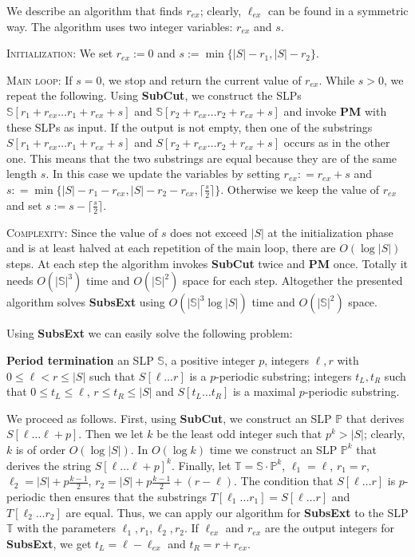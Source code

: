 \documentclass[11pt]{article}
\theoremstyle{break}
\newcommand{\slp}[1]{\mathbb{#1}}
\newcommand{\substr}[2]{[#1\dots#2]}
\newcommand{\subslp}[3]{\slp{#1}[#2\dots#3]}
\newcommand{\problem}[3]{\smallskip
            \noindent {\sc Problem:} \textbf{#1} \newline
            \noindent {\sc Input:} #2 \newline
            \noindent {\sc Output:} #3
\smallskip}
\begin{document}
We describe an algorithm that finds $r_{ex}$; clearly, $\ell_{ex}$ can be found in a symmetric way. The algorithm uses two integer
variables: $r_{ex}$ and $s$.

\smallskip

\noindent \textsc{Initialization:} We set $r_{ex}:=0$ and $s:=\min \{|S|-r_1,|S|-r_2\}$.

\smallskip

\noindent \textsc{Main loop:} If $s=0$, we stop and return the current value of $r_{ex}$. While $s>0$, we repeat the following. Using
\textbf{SubCut}, we construct the SLPs $\subslp{S}{r_1+ r_{ex}}{r_1 + r_{ex} + s}$ and $\subslp{S}{r_2+r_{ex}}{r_2 + r_{ex} + s}$ and
invoke \textbf{PM} with these SLPs as input. If the output is not empty, then one of the substrings $S\substr{r_1+ r_{ex}}{r_1 + r_{ex}+s}$
and $S\substr{r_2+ r_{ex}}{r_2 + r_{ex}+s}$ occurs as in the other one. This means that the two substrings are equal because they are of
the same length $s$. In this case we update the variables by setting $r_{ex}: = r_{ex} + s$ and $s: = \min \{|S| - r_1-r_{ex}, |S| -
r_2-r_{ex},\lceil \frac{s}{2} \rceil\}$. Otherwise we keep the value of $r_{ex}$ and set $s:=s-\lceil \frac{s}{2} \rceil$.

\smallskip

\noindent \textsc{Complexity:} Since the value of $s$ does not exceed $|S|$ at the initialization phase and is at least halved at each
repetition of the main loop, there are $O(\log |S|)$ steps. At each step the algorithm invokes \textbf{SubCut} twice and \textbf{PM} once.
Totally it needs $O(|\slp{S}|^3)$ time and $O(|\slp{S}|^2)$ space for each step. Altogether the presented algorithm solves \textbf{SubsExt}
using $O(|\slp{S}|^3 \log|S|)$ time and $O(|\slp{S}|^2)$ space.

\smallskip

Using \textbf{SubsExt} we can easily solve the following problem:

\problem{Period termination}{an SLP $\slp{S}$, a positive integer $p$, integers $\ell,r$ with $0 \le \ell < r \le |S|$ such that
$S\substr{\ell}{r}$ is a $p$-periodic substring;}{integers $t_L, t_R$ such that $0\le t_L\le\ell$, $r\le t_R\le |S|$ and
$S\substr{t_L}{t_R}$ is a maximal $p$-periodic substring.}

We proceed as follows. First, using \textbf{SubCut}, we construct an SLP $\slp{P}$ that derives $S\substr{\ell}{\ell + p}$. Then we let $k$
be the least odd integer such that $p^k > |S|$; clearly, $k$ is of order $O(\log|S|)$. In $O(\log k)$ time we construct an SLP $\slp{P}^k$
that derives the string $S\substr{\ell}{\ell+p}^k$. Finally, let $\slp{T}=\slp{S} \cdot \slp{P}^k$, $\ell_1 = \ell$, $r_1 = r$, $\ell_2 =
|S| + p\frac{k-1}{2}$, $r_2 = |S| + p\frac{k-1}{2} + (r - \ell)$. The condition that $S\substr{\ell}{r}$ is $p$-periodic then ensures that
the substrings $T\substr{\ell_1}{r_1}=S\substr{\ell}{r}$ and $T\substr{\ell_2}{r_2}$ are equal. Thus, we can apply our algorithm for
\textbf{SubsExt} to the SLP $\slp{T}$ with the parameters $\ell_1,r_1,\ell_2,r_2$. If $\ell_{ex}$ and $r_{ex}$ are the output integers for
\textbf{SubsExt}, we get $t_L=\ell-\ell_{ex}$ and $t_R=r+r_{ex}$.
\end{document}
